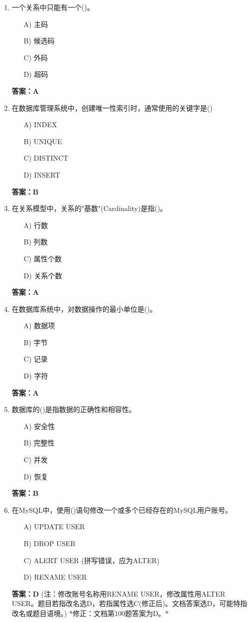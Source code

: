 \documentclass[a4paper,12pt]{article}
\begin{document}
\begin{enumerate}[label=\arabic*.]
\item 一个关系中只能有一个()。
\begin{itemize}
    \item[A)] 主码
    \item[B)] 候选码
    \item[C)] 外码
    \item[D)] 超码
\end{itemize}
\textbf{答案：A}

\item 在数据库管理系统中，创建唯一性索引时，通常使用的关键字是()
\begin{itemize}
    \item[A)] INDEX
    \item[B)] UNIQUE
    \item[C)] DISTINCT
    \item[D)] INSERT
\end{itemize}
\textbf{答案：B}

\item 在关系模型中，关系的"基数"(Cardinality)是指()。
\begin{itemize}
    \item[A)] 行数
    \item[B)] 列数
    \item[C)] 属性个数
    \item[D)] 关系个数
\end{itemize}
\textbf{答案：A}

\item 在数据库系统中，对数据操作的最小单位是()。
\begin{itemize}
    \item[A)] 数据项
    \item[B)] 字节
    \item[C)] 记录
    \item[D)] 字符
\end{itemize}
\textbf{答案：A}

\item 数据库的()是指数据的正确性和相容性。
\begin{itemize}
    \item[A)] 安全性
    \item[B)] 完整性
    \item[C)] 并发
    \item[D)] 恢复
\end{itemize}
\textbf{答案：B}

\item 在MySQL中，使用()语句修改一个或多个已经存在的MySQL用户账号。
\begin{itemize}
    \item[A)] UPDATE USER
    \item[B)] DROP USER
    \item[C)] ALERT USER (拼写错误，应为ALTER)
    \item[D)] RENAME USER
\end{itemize}
\textbf{答案：D} (注：修改账号名称用RENAME USER，修改属性用ALTER USER。题目若指改名选D，若指属性选C(修正后)。文档答案选D，可能特指改名或题目语境。) *修正：文档第100题答案为D。*


\end{enumerate}
\end{document}
